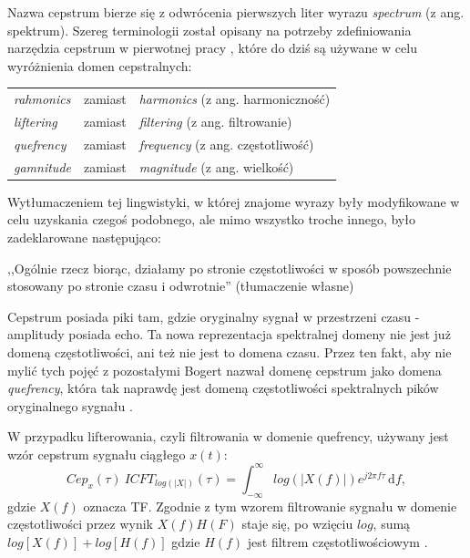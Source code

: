 \documentclass[12pt,a4paper,twoside]{mwart}
\begin{document}
Nazwa cepstrum bierze się z odwrócenia pierwszych liter wyrazu \textit{spectrum} (z ang. spektrum). Szereg terminologii został opisany na potrzeby zdefiniowania narzędzia cepstrum w pierwotnej pracy \cite{Transcription:Bogert:FirstCepstrum}, które do dziś są używane w celu wyróżnienia domen cepstralnych:
\begin{table}[H]\centering
  \begin{tabular}{lll}
  \textit{rahmonics} & zamiast & \textit{harmonics} (z ang. harmoniczność) \\
  \textit{liftering} & zamiast & \textit{filtering} (z ang. filtrowanie) \\
  \textit{quefrency} & zamiast & \textit{frequency} (z ang. częstotliwość) \\
  \textit{gamnitude} & zamiast & \textit{magnitude} (z ang. wielkość)
  \end{tabular}
\end{table}
\noindent Wytłumaczeniem tej lingwistyki, w której znajome wyrazy były modyfikowane w celu uzyskania czegoś podobnego, ale mimo wszystko troche innego, było zadeklarowane następująco: 
\begin{displayquote}
,,Ogólnie rzecz biorąc, działamy po stronie częstotliwości w sposób powszechnie stosowany po stronie czasu i odwrotnie'' 
\cite[95]{Transcription:Oppenheim:HistoryOfCepstrum} 
(tłumaczenie własne)
\end{displayquote}

Cepstrum posiada piki tam, gdzie oryginalny sygnał w przestrzeni czasu - amplitudy posiada echo. Ta nowa reprezentacja spektralnej domeny nie jest już domeną częstotliwości, ani też nie jest to domena czasu. Przez ten fakt, aby nie mylić tych pojęć z pozostałymi Bogert nazwał domenę cepstrum jako domena \textit{quefrency}, która tak naprawdę jest domeną częstotliwości spektralnych pików oryginalnego sygnału 
\cite[1-4]{Transcription:Randall:CepstrumHistory}
.

W przypadku lifterowania, czyli filtrowania w domenie quefrency, używany jest wzór cepstrum sygnału ciągłego $x(t)$:
\begin{equation}\label{eq:ceps:continous}
Cep_x(\tau) \ ICFT_{log(|X|)}(\tau) = \int_{-\infty}^{\infty}  log(|X(f)|)e^{j2\pi f\tau}\,\mathrm{d}f, 
\end{equation}
gdzie  $X(f)$ oznacza TF. Zgodnie z tym wzorem filtrowanie sygnału w domenie częstotliwości przez wynik $X(f)H(F)$ staje się, po wzięciu $log$, sumą $log[X(f)] + log[H(f)]$ gdzie $H(f)$ jest filtrem częstotliwościowym 
\cite[25-27]{Transcription:Anssi:SignalProcessingMethods}
.
\end{document}
